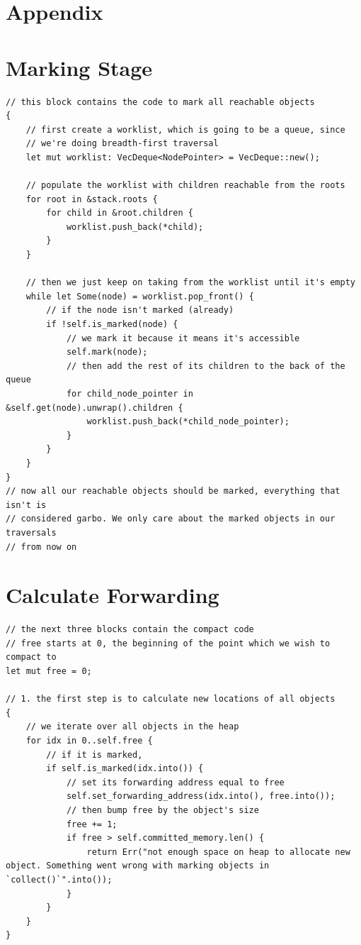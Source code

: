 \documentclass[index]{subfiles}
\begin{document}
\section{Appendix}

\appendix
\section{Marking Stage}
\begin{verbatim}
// this block contains the code to mark all reachable objects
{
    // first create a worklist, which is going to be a queue, since
    // we're doing breadth-first traversal
    let mut worklist: VecDeque<NodePointer> = VecDeque::new();

    // populate the worklist with children reachable from the roots
    for root in &stack.roots {
        for child in &root.children {
            worklist.push_back(*child);
        }
    }

    // then we just keep on taking from the worklist until it's empty
    while let Some(node) = worklist.pop_front() {
        // if the node isn't marked (already)
        if !self.is_marked(node) {
            // we mark it because it means it's accessible
            self.mark(node);
            // then add the rest of its children to the back of the queue
            for child_node_pointer in &self.get(node).unwrap().children {
                worklist.push_back(*child_node_pointer);
            }
        }
    }
}
// now all our reachable objects should be marked, everything that isn't is
// considered garbo. We only care about the marked objects in our traversals
// from now on
\end{verbatim}
\section{Calculate Forwarding}
\begin{verbatim}
// the next three blocks contain the compact code
// free starts at 0, the beginning of the point which we wish to compact to
let mut free = 0;

// 1. the first step is to calculate new locations of all objects
{
    // we iterate over all objects in the heap
    for idx in 0..self.free {
        // if it is marked,
        if self.is_marked(idx.into()) {
            // set its forwarding address equal to free
            self.set_forwarding_address(idx.into(), free.into());
            // then bump free by the object's size
            free += 1;
            if free > self.committed_memory.len() {
                return Err("not enough space on heap to allocate new object. Something went wrong with marking objects in `collect()`".into());
            }
        }
    }
}
\end{verbatim}
\end{document}
